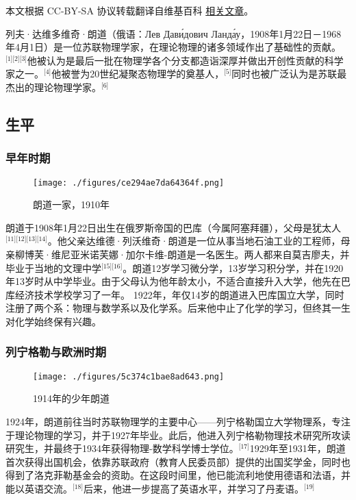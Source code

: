 
本文根据 CC-BY-SA 协议转载翻译自维基百科 \href{https://en.wikipedia.org/wiki/Lev_Landau}{相关文章}。

列夫·达维多维奇·朗道（俄语：Лев Дави́дович Ланда́у，1908年1月22日－1968年4月1日）是一位苏联物理学家，在理论物理的诸多领域作出了基础性的贡献。\(^\text{[1][2][3]}\)他被认为是最后一批在物理学各个分支都造诣深厚并做出开创性贡献的科学家之一。\(^\text{[4]}\)他被誉为20世纪凝聚态物理学的奠基人，\(^\text{[5]}\)同时也被广泛认为是苏联最杰出的理论物理学家。\(^\text{[6]}\)
\subsection{生平}
\subsubsection{早年时期}
\begin{figure}[ht]
\centering
\texttt{[image: ./figures/ce294ae7da64364f.png]}
\caption{朗道一家，1910年} \label{fig_LFLD_1}
\end{figure}
朗道于1908年1月22日出生在俄罗斯帝国的巴库（今属阿塞拜疆），父母是犹太人\(^\text{[11][12][13][14]}\)。他父亲达维德·列沃维奇·朗道是一位从事当地石油工业的工程师，母亲柳博芙·维尼亚米诺芙娜·加尔卡维-朗道是一名医生。两人都来自莫吉廖夫，并毕业于当地的文理中学\(^\text{[15][16]}\)。朗道12岁学习微分学，13岁学习积分学，并在1920年13岁时从中学毕业。由于父母认为他年龄太小，不适合直接升入大学，他先在巴库经济技术学校学习了一年。
1922年，年仅14岁的朗道进入巴库国立大学，同时注册了两个系：物理与数学系以及化学系。后来他中止了化学的学习，但终其一生对化学始终保有兴趣。
\subsubsection{列宁格勒与欧洲时期}
\begin{figure}[ht]
\centering
\texttt{[image: ./figures/5c374c1bae8ad643.png]}
\caption{1914年的少年朗道} \label{fig_LFLD_2}
\end{figure}
1924年，朗道前往当时苏联物理学的主要中心——列宁格勒国立大学物理系，专注于理论物理的学习，并于1927年毕业。此后，他进入列宁格勒物理技术研究所攻读研究生，并最终于1934年获得物理-数学科学博士学位。\(^\text{[17]}\)1929年至1931年，朗道首次获得出国机会，依靠苏联政府（教育人民委员部）提供的出国奖学金，同时也得到了洛克菲勒基金会的资助。在这段时间里，他已能流利地使用德语和法语，并能以英语交流。\(^\text{[18]}\)后来，他进一步提高了英语水平，并学习了丹麦语。\(^\text{[19]}\)


